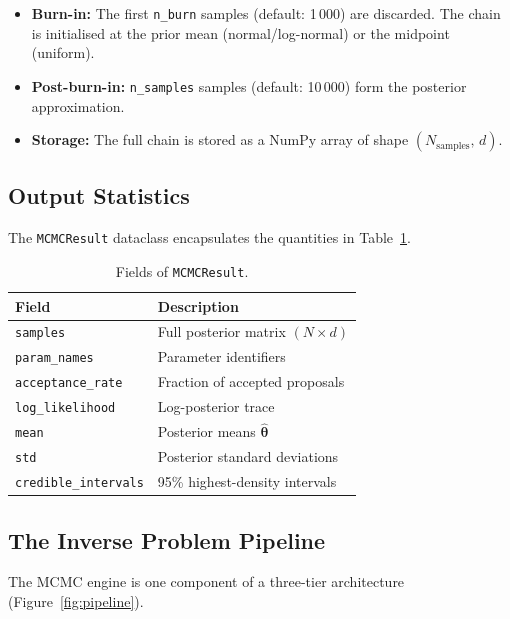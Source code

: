 \documentclass[11pt,letterpaper,twocolumn]{article}
\newcommand{\code}[1]{\texttt{#1}}
\theoremstyle{definition}
\begin{document}
\begin{itemize}
  \item \textbf{Burn-in:} The first \code{n\_burn} samples (default: 1\,000) are discarded.  The chain is initialised at the prior mean (normal/log-normal) or the midpoint (uniform).
  \item \textbf{Post-burn-in:} \code{n\_samples} samples (default: 10\,000) form the posterior approximation.
  \item \textbf{Storage:} The full chain is stored as a NumPy array of shape $(N_{\mathrm{samples}},\,d)$.
\end{itemize}

\subsection{Output Statistics}

The \code{MCMCResult} dataclass encapsulates the quantities in Table~\ref{tab:mcmc-output}.

\begin{table}[H]
\centering
\caption{Fields of \code{MCMCResult}.}\label{tab:mcmc-output}
\small
\setlength{\tabcolsep}{4pt}
\begin{tabular}{@{}lp{3.8cm}@{}}
\toprule
\textbf{Field} & \textbf{Description} \\
\midrule
\code{samples}            & Full posterior matrix $(N \!\times\! d)$ \\
\code{param\_names}       & Parameter identifiers \\
\code{acceptance\_rate}   & Fraction of accepted proposals \\
\code{log\_likelihood}    & Log-posterior trace \\
\code{mean}               & Posterior means $\hat{\bm{\theta}}$ \\
\code{std}                & Posterior standard deviations \\
\code{credible\_intervals}& 95\% highest-density intervals \\
\bottomrule
\end{tabular}
\end{table}

\subsection{The Inverse Problem Pipeline}

The MCMC engine is one component of a three-tier architecture (Figure~\ref{fig:pipeline}).
\end{document}

